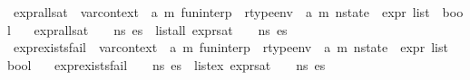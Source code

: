 \begin{isabellebody}
\isanewline
{}\isamarkupfalse%
\ expr{\isacharunderscore}{\kern0pt}all{\isacharunderscore}{\kern0pt}sat\ {\isacharcolon}{\kern0pt}{\isacharcolon}{\kern0pt}\ {\isachardoublequoteopen}var{\isacharunderscore}{\kern0pt}context\ {\isasymRightarrow}\ {\isacharparenleft}{\kern0pt}{\isacharprime}{\kern0pt}a{\isacharcomma}{\kern0pt}\ {\isacharprime}{\kern0pt}m{\isacharparenright}{\kern0pt}\ fun{\isacharunderscore}{\kern0pt}interp\ {\isasymRightarrow}\ rtype{\isacharunderscore}{\kern0pt}env\ {\isacharequal}{\kern0pt}{\isachargreater}{\kern0pt}\ {\isacharparenleft}{\kern0pt}{\isacharprime}{\kern0pt}a{\isacharcomma}{\kern0pt}\ {\isacharprime}{\kern0pt}m{\isacharparenright}{\kern0pt}\ nstate\ {\isasymRightarrow}\ expr\ list\ {\isasymRightarrow}\ bool{\isachardoublequoteclose}\isanewline
\ \ \ {\isachardoublequoteopen}expr{\isacharunderscore}{\kern0pt}all{\isacharunderscore}{\kern0pt}sat\ {\isasymLambda}\ {\isasymGamma}\ {\isasymOmega}\ n{\isacharunderscore}{\kern0pt}s\ es\ {\isacharequal}{\kern0pt}\ list{\isacharunderscore}{\kern0pt}all\ {\isacharparenleft}{\kern0pt}expr{\isacharunderscore}{\kern0pt}sat\ {\isasymLambda}\ {\isasymGamma}\ {\isasymOmega}\ n{\isacharunderscore}{\kern0pt}s{\isacharparenright}{\kern0pt}\ es{\isachardoublequoteclose}\isanewline
\isanewline
{}\isamarkupfalse%
\ expr{\isacharunderscore}{\kern0pt}exists{\isacharunderscore}{\kern0pt}fail\ {\isacharcolon}{\kern0pt}{\isacharcolon}{\kern0pt}\ {\isachardoublequoteopen}var{\isacharunderscore}{\kern0pt}context\ {\isasymRightarrow}\ {\isacharparenleft}{\kern0pt}{\isacharprime}{\kern0pt}a{\isacharcomma}{\kern0pt}\ {\isacharprime}{\kern0pt}m{\isacharparenright}{\kern0pt}\ fun{\isacharunderscore}{\kern0pt}interp\ {\isasymRightarrow}\ rtype{\isacharunderscore}{\kern0pt}env\ {\isacharequal}{\kern0pt}{\isachargreater}{\kern0pt}\ {\isacharparenleft}{\kern0pt}{\isacharprime}{\kern0pt}a{\isacharcomma}{\kern0pt}\ {\isacharprime}{\kern0pt}m{\isacharparenright}{\kern0pt}\ nstate\ {\isasymRightarrow}\ expr\ list\ {\isasymRightarrow}\ bool{\isachardoublequoteclose}\isanewline
\ \ \ {\isachardoublequoteopen}expr{\isacharunderscore}{\kern0pt}exists{\isacharunderscore}{\kern0pt}fail\ {\isasymLambda}\ {\isasymGamma}\ {\isasymOmega}\ n{\isacharunderscore}{\kern0pt}s\ es\ {\isacharequal}{\kern0pt}\ list{\isacharunderscore}{\kern0pt}ex\ {\isacharparenleft}{\kern0pt}expr{\isacharunderscore}{\kern0pt}sat\ {\isasymLambda}\ {\isasymGamma}\ {\isasymOmega}\ n{\isacharunderscore}{\kern0pt}s{\isacharparenright}{\kern0pt}\ es{\isachardoublequoteclose}\isanewline

\end{isabellebody}
